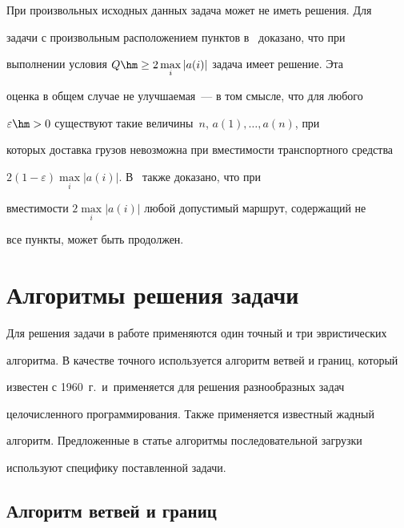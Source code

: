   При произвольных исходных данных задача может не иметь решения. Для 


задачи с произвольным расположением пунктов в~\cite{7-br} доказано, что при 


выполнении условия $Q\hm\geq 2\max\limits_i |a(i)|$ задача имеет решение. Эта 


оценка в общем случае не улучшаемая~--- в том смысле, что для любого 


$\varepsilon\hm>0$ существуют такие величины~$n$, $a(1), \ldots , a(n)$, при 


которых доставка грузов невозможна при вмес\-ти\-мости транспортного средства 


$2(1-\varepsilon )\max\limits_i |a(i)|$. В~\cite{7-br} также доказано, что при 


вместимости $2\max\limits_i |a(i)|$ любой допустимый маршрут, содержащий не 


все пункты, может быть продолжен.


  


\section{Алгоритмы решения задачи}





  Для решения задачи в работе применяются один точный и три эвристических 


алгоритма. В качестве точного используется алгоритм ветвей и границ, который 


известен с 1960~г.\ и~применяется для решения разнообразных задач 


це\-ло\-чис\-лен\-но\-го программирования. Также применяется известный жадный 


алгоритм. Предложенные в статье алгоритмы последовательной загрузки 


используют специфику поставленной задачи.





\vspace*{-6pt}


  


\subsection{Алгоритм ветвей и границ}





